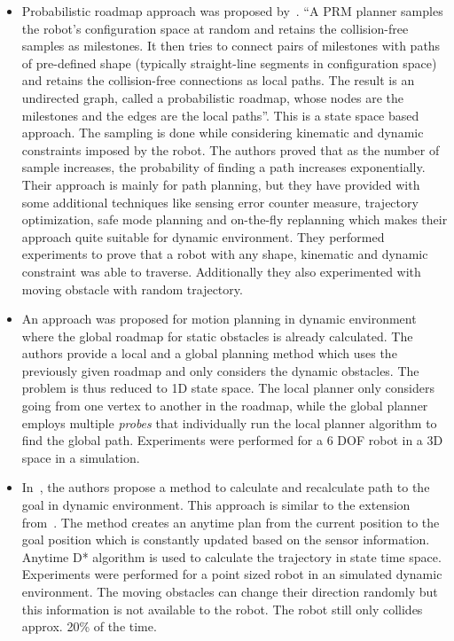 \begin{itemize}
    \item Probabilistic roadmap approach was proposed by~\cite{hsu2002randomized}. ``A PRM planner samples the robot’s configuration space at random and retains the collision-free samples as milestones.  It then tries to connect pairs of milestones with paths of pre-defined shape (typically straight-line segments in configuration space) and retains the collision-free connections as local paths. The result is an undirected graph, called a probabilistic roadmap, whose nodes are the milestones and the edges are the local paths''\cite{hsu2002randomized}. This is a state space based approach. The sampling is done while considering kinematic and dynamic constraints imposed by the robot. The authors proved that as the number of sample increases, the probability of finding a path increases exponentially. Their approach is mainly for path planning, but they have provided with some additional techniques like sensing error counter measure, trajectory optimization, safe mode planning and on-the-fly replanning which makes their approach quite suitable for dynamic environment. They performed experiments to prove that a robot with any shape, kinematic and dynamic constraint was able to traverse. Additionally they also experimented with moving obstacle with random trajectory.

    \item An approach\cite{van2005roadmap} was proposed for motion planning in dynamic environment where the global roadmap for static obstacles is already calculated. The authors provide a local and a global planning method which uses the previously given roadmap and only considers the dynamic obstacles. The problem is thus reduced to 1D state space. The local planner only considers going from one vertex to another in the roadmap, while the global planner employs multiple \textit{probes} that individually run the local planner algorithm to find the global path. Experiments were performed for a 6 DOF robot in a 3D space in a simulation.
    \item In~\cite{van2006anytime}, the authors propose a method to calculate and recalculate path to the goal in dynamic environment. This approach is similar to the extension from~\cite{hsu2002randomized}. The method creates an anytime plan from the current position to the goal position which is constantly updated based on the sensor information. Anytime D* algorithm is used to calculate the trajectory in state time space. Experiments were performed for a point sized robot in an simulated dynamic environment. The moving obstacles can change their direction randomly but this information is not available to the robot. The robot still only collides approx. 20\% of the time.
\end{itemize}

